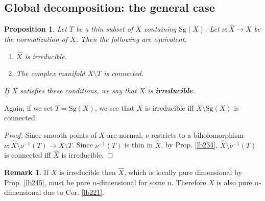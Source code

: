 \documentclass[12pt,b5paper,notitlepage]{report}
\theoremstyle{definition}
\newtheorem{rem}[df]{Remark}
\theoremstyle{plain}
\newtheorem{pp}[df]{Proposition}
\newcommand{\wht}{\widehat}
\newcommand{\Sg}{\mathrm{Sg}}
\numberwithin{equation}{section}
\begin{document}
\subsection{Global decomposition: the general case}




\begin{pp}
Let $T$ be a thin subset of $X$ {\color{red}containing $\Sg(X)$}. Let $\nu:\wht X\rightarrow X$ be the normalization of $X$. Then the following are equivalent.
\begin{enumerate}[label=(\arabic*)]
\item $\wht X$ is irreducible.
\item The complex manifold $X\setminus T$ is connected.
\end{enumerate}
If $X$ satisfies these conditions, we say that $X$ is \textbf{irreducible}. 
\end{pp}

Again, if we set $T=\Sg(X)$, we see that $X$ is irreducible iff $X\setminus\Sg(X)$ is connected.


\begin{proof}
Since smooth points of $X$ are normal, $\nu$ restricts to a biholomorphism $\nu:\wht X\setminus\nu^{-1}(T)\rightarrow X\setminus T$. Since $\nu^{-1}(T)$ is thin in $\wht X$, by Prop. \ref{lb234}, $\wht X\setminus\nu^{-1}(T)$ is connected iff $\wht X$ is irreducible.
\end{proof}


\begin{rem}
If $X$ is irreducible then $\wht X$, which is locally pure dimensional by Prop. \ref{lb245}, must be pure $n$-dimensional for some $n$. Therefore $X$ is also pure $n$-dimensional due to Cor. \ref{lb221}.
\end{rem}
\end{document}
